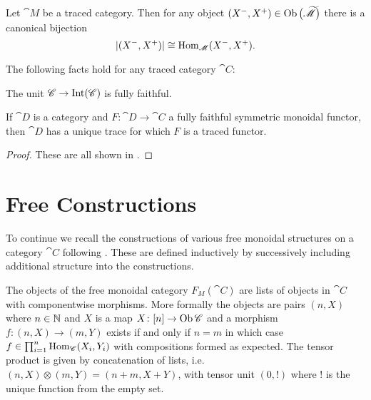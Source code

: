 \documentclass[12pt,oneside,article,draft]{memoir}
\begin{document}
\begin{lemma}

Let $\cat{M}$ be a traced category.  Then for any object $(X^-,X^+)\in\operatorname{Ob}\big(\widetilde{\mathscr{M}}\big)$ there is a canonical bijection
\[|(X^-,X^+)|\cong\operatorname{Hom}_{\mathscr{M}}(X^-,X^+).\]

\end{lemma}

\begin{lemma}\label{lemma:fully faithful and trace}
The following facts hold for any traced category $\cat{C}$:
\begin{compactitem}
	\item The unit $\mathscr{C}\to\operatorname{Int}(\mathscr{C})$ is fully faithful.
	\item If $\cat{D}$ is a category and $F\colon\cat{D}\to\cat{C}$ a fully faithful symmetric monoidal functor, then $\cat{D}$ has a unique trace for which $F$ is a traced functor.
\end{compactitem}
\end{lemma}

\begin{proof}

These are all shown in \cite{Joyal-Street-Verity}.

\end{proof}

\section{Free Constructions}

To continue we recall the constructions of various free monoidal structures on a category $\cat{C}$ following \cite{abramsky}.  These are defined inductively by successively including additional structure into the constructions.

The objects of the free monoidal category $F_M(\cat{C})$ are lists of objects in $\cat{C}$ with componentwise morphisms.  More formally the objects are pairs $(n,X)$ where $n\in\mathbb{N}$ and $X$ is a map $X\colon[n]\to \operatorname{Ob}\mathscr{C}$ and a morphism $f:(n,X)\to(m,Y)$ exists if and only if $n=m$ in which case $f\in\prod_{i=1}^n\operatorname{Hom}_{\mathscr{C}}(X_i,Y_i)$ with compositions formed as expected.  The tensor product is given by concatenation of lists, i.e. $(n,X)\otimes(m,Y)=(n+m,X+Y)$, with tensor unit $(0,!)$ where $!$ is the unique function from the empty set.
\end{document}

